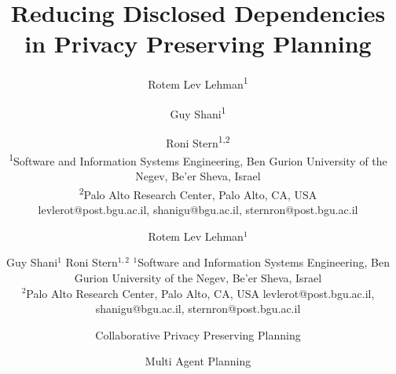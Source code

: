 \documentclass{article}
\author{Rotem Lev Lehman\textsuperscript{\rm 1} \and Guy Shani\textsuperscript{\rm 1} \and Roni Stern\textsuperscript{\rm 1,2} \\ %
\textsuperscript{\rm 1}Software and Information Systems Engineering, Ben Gurion University of the Negev, Be'er Sheva, Israel\\
\textsuperscript{\rm 2}Palo Alto Research Center, Palo Alto, CA, USA\\
levlerot@post.bgu.ac.il, shanigu@bgu.ac.il, sternron@post.bgu.ac.il \\
}
\title{Reducing Disclosed Dependencies in Privacy Preserving Planning}
\author{
Rotem Lev Lehman$^1$\and
Guy Shani$^1$\And
Roni Stern$^{1,2}$
\affiliations
$^1$Software and Information Systems Engineering, Ben Gurion University of the Negev, Be'er Sheva, Israel\\
$^2$Palo Alto Research Center, Palo Alto, CA, USA
\emails
levlerot@post.bgu.ac.il,
shanigu@bgu.ac.il,
sternron@post.bgu.ac.il
}
\author{
Collaborative Privacy Preserving Planning\and
Multi Agent Planning
}
\newcommand{\cppp}{\textsc {cppp}\xspace}
\newcommand{\rotem}[1]{\textbf{\color{red}[ROTEM:#1]}}
\newcommand{\roni}[1]{\textbf{\color{blue}[RONI:#1]}}
\theoremstyle{remark}
\begin{document}
\maketitle

\begin{abstract}


\end{abstract}
\end{document}
